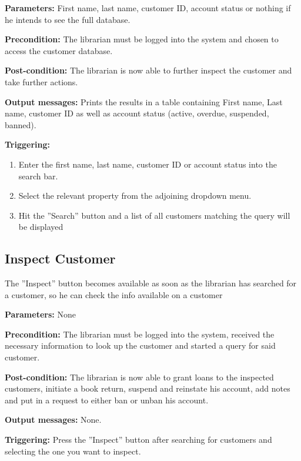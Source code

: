 \begin{description}

\item \textbf{Parameters:} First name, last name, customer ID, account status or nothing if he intends to
see the full database. 

\item \textbf{Precondition:} The librarian must be logged into the system and
chosen to access the customer database.

\item \textbf{Post-condition:} The librarian is now able to further inspect the
customer and take further actions.

\item \textbf{Output messages:} Prints the results in a table containing First
name, Last name, customer ID as well as account status (active, overdue, suspended, banned).

\item \textbf{Triggering:}
\begin{enumerate}
\item Enter the first name, last name, customer ID or account status into the search bar.
\item Select the relevant property from the adjoining dropdown menu.
\item Hit the ''Search'' button and a list of all customers matching the query
will be displayed
\end{enumerate}

\end{description}

\subsection{Inspect Customer}

The ''Inspect'' button becomes available as soon as the librarian has searched
for a customer, so he can check the info available on a customer

\begin{description}

\item \textbf{Parameters:} None

\item \textbf{Precondition:} The librarian must be logged into the system,
received the necessary information to look up the customer and started a query
for said customer.

\item \textbf{Post-condition:} The librarian is now able to grant loans to the
inspected customers, initiate a book return, suspend and reinstate his account,
add notes and put in a request to either ban or unban his account.

\item \textbf{Output messages:} None.

\item \textbf{Triggering:} Press the ''Inspect'' button after searching for
customers and selecting the one you want to inspect.

\end{description}

